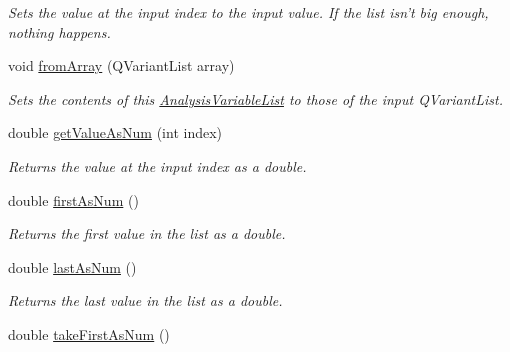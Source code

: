 \begin{DoxyCompactItemize}
\begin{DoxyCompactList}\small\item\em Sets the value at the input index to the input value. If the list isn't big enough, nothing happens. \end{DoxyCompactList}\item 
void \hyperlink{class_picto_1_1_analysis_variable_list_ac0dcf657a7363d70bdc8f88bcd6971bb}{from\-Array} (Q\-Variant\-List array)
\begin{DoxyCompactList}\small\item\em Sets the contents of this \hyperlink{class_picto_1_1_analysis_variable_list}{Analysis\-Variable\-List} to those of the input Q\-Variant\-List. \end{DoxyCompactList}\item 
\hypertarget{class_picto_1_1_analysis_variable_list_aaff579371f12004991d884df97cf1517}{double \hyperlink{class_picto_1_1_analysis_variable_list_aaff579371f12004991d884df97cf1517}{get\-Value\-As\-Num} (int index)}\label{class_picto_1_1_analysis_variable_list_aaff579371f12004991d884df97cf1517}

\begin{DoxyCompactList}\small\item\em Returns the value at the input index as a double. \end{DoxyCompactList}\item 
\hypertarget{class_picto_1_1_analysis_variable_list_aecf1fe74bac4c0425769982fffd6bb8f}{double \hyperlink{class_picto_1_1_analysis_variable_list_aecf1fe74bac4c0425769982fffd6bb8f}{first\-As\-Num} ()}\label{class_picto_1_1_analysis_variable_list_aecf1fe74bac4c0425769982fffd6bb8f}

\begin{DoxyCompactList}\small\item\em Returns the first value in the list as a double. \end{DoxyCompactList}\item 
\hypertarget{class_picto_1_1_analysis_variable_list_ab8327a2a13d12929da67083395cf53dd}{double \hyperlink{class_picto_1_1_analysis_variable_list_ab8327a2a13d12929da67083395cf53dd}{last\-As\-Num} ()}\label{class_picto_1_1_analysis_variable_list_ab8327a2a13d12929da67083395cf53dd}

\begin{DoxyCompactList}\small\item\em Returns the last value in the list as a double. \end{DoxyCompactList}\item 
\hypertarget{class_picto_1_1_analysis_variable_list_a0084829927b14eff8427a88779c7f34f}{double \hyperlink{class_picto_1_1_analysis_variable_list_a0084829927b14eff8427a88779c7f34f}{take\-First\-As\-Num} ()}\label{class_picto_1_1_analysis_variable_list_a0084829927b14eff8427a88779c7f34f}


\end{DoxyCompactItemize}
